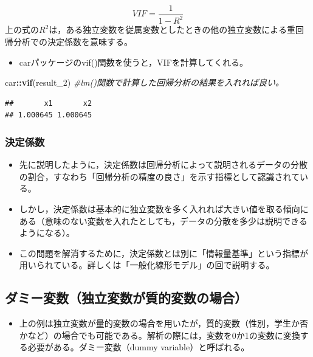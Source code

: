 \documentclass[]{article}
\newenvironment{Shaded}{\begin{snugshade}}{\end{snugshade}}
\newcommand{\KeywordTok}[1]{\textcolor[rgb]{0.13,0.29,0.53}{\textbf{#1}}}
\newcommand{\DecValTok}[1]{\textcolor[rgb]{0.00,0.00,0.81}{#1}}
\newcommand{\CommentTok}[1]{\textcolor[rgb]{0.56,0.35,0.01}{\textit{#1}}}
\newcommand{\OperatorTok}[1]{\textcolor[rgb]{0.81,0.36,0.00}{\textbf{#1}}}
\newcommand{\NormalTok}[1]{#1}
\providecommand{\tightlist}{%
  \setlength{\itemsep}{0pt}\setlength{\parskip}{0pt}}
\begin{document}
\[
VIF = \frac{1}{1-R^2}
\]
上の式の\(R^2\)は，ある独立変数を従属変数としたときの他の独立変数による重回帰分析での決定係数を意味する。

\begin{itemize}
\tightlist
\item
  carパッケージのvif()関数を使うと，VIFを計算してくれる。
\end{itemize}

\begin{Shaded}
\begin{Highlighting}[]
\NormalTok{car}\OperatorTok{::}\KeywordTok{vif}\NormalTok{(result_}\DecValTok{2}\NormalTok{) }\CommentTok{#lm()関数で計算した回帰分析の結果を入れれば良い。}
\end{Highlighting}
\end{Shaded}

\begin{verbatim}
##       x1       x2 
## 1.000645 1.000645
\end{verbatim}

\subsubsection{決定係数}

\begin{itemize}
\tightlist
\item
  先に説明したように，決定係数は回帰分析によって説明されるデータの分散の割合，すなわち「回帰分析の精度の良さ」を示す指標として認識されている。\\
\item
  しかし，決定係数は基本的に独立変数を多く入れれば大きい値を取る傾向にある（意味のない変数を入れたとしても，データの分散を多少は説明できるようになる）。\\
\item
  この問題を解消するために，決定係数とは別に「情報量基準」という指標が用いられている。詳しくは「一般化線形モデル」の回で説明する。
\end{itemize}

\subsection{ダミー変数（独立変数が質的変数の場合）}

\begin{itemize}
\tightlist
\item
  上の例は独立変数が量的変数の場合を用いたが，質的変数（性別，学生か否かなど）の場合でも可能である。解析の際には，変数を0か1の変数に変換する必要がある。ダミー変数（dummy
  variable）と呼ばれる。
\end{itemize}
\end{document}
